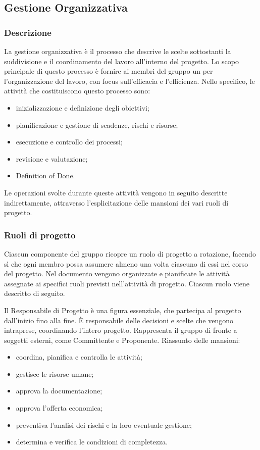 \subsection{Gestione Organizzativa}
	
		\subsubsection{Descrizione}
			La gestione organizzativa è il processo che descrive le scelte sottostanti la suddivisione e il coordinamento del lavoro all'interno del progetto. Lo scopo principale di questo processo è fornire ai membri del gruppo un \PdP{} per l'organizzazione del lavoro, con focus sull'efficacia e l'efficienza. Nello specifico, le attività che costituiscono questo processo sono:
			\begin{itemize}
				\item {inizializzazione e definizione degli obiettivi;}
				\item {pianificazione e gestione di scadenze, rischi e risorse;}
				\item {esecuzione e controllo dei processi;}
				\item {revisione e valutazione;}
				\item {Definition of Done.}
			\end{itemize}
			Le operazioni svolte durante queste attività vengono in seguito descritte indirettamente, attraverso l'esplicitazione delle mansioni dei vari ruoli di progetto.
			
			\subsubsection{Ruoli di progetto}
			Ciascun componente del gruppo ricopre un ruolo di progetto a rotazione, facendo sì che ogni membro possa assumere almeno una volta ciascuno di essi nel corso del progetto. Nel documento  vengono organizzate e pianificate le attività assegnate ai specifici ruoli previsti nell'attività di progetto. Ciascun ruolo viene descritto di seguito.
			
			Il Responsabile di Progetto è una figura essenziale, che partecipa al progetto dall'inizio fino alla fine. È responsabile delle decisioni e scelte che vengono intraprese, coordinando l'intero progetto. Rappresenta il gruppo di fronte a soggetti esterni, come Committente e Proponente.
			Riassunto delle mansioni:
			\begin{itemize}
				\item coordina, pianifica e controlla le attività;
				\item gestisce le risorse umane;
				\item approva la documentazione;
				\item approva l'offerta economica;
				\item preventiva l'analisi dei rischi e la loro eventuale gestione;
				\item determina e verifica le condizioni di completezza.
			\end{itemize}
			
